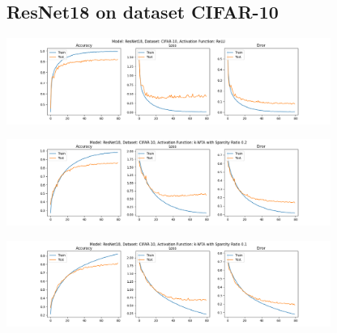 \documentclass[a4paper]{article}
\begin{document}
		\subsection{ResNet18 on dataset CIFAR-10}
			\begin{center}
				\centering
				\includegraphics[width=400px,keepaspectratio]{Results/ResNet18_CIFAR-10_ReLU.png}
			\end{center}
			\begin{center}
				\centering
				\includegraphics[width=400px,keepaspectratio]{Results/ResNet18_CIFAR-10_k-WTA_0.2.png}
			\end{center}
			\begin{center}
				\centering
				\includegraphics[width=400px,keepaspectratio]{Results/ResNet18_CIFAR-10_k-WTA_0.1.png}
			\end{center}
		
\end{document}
